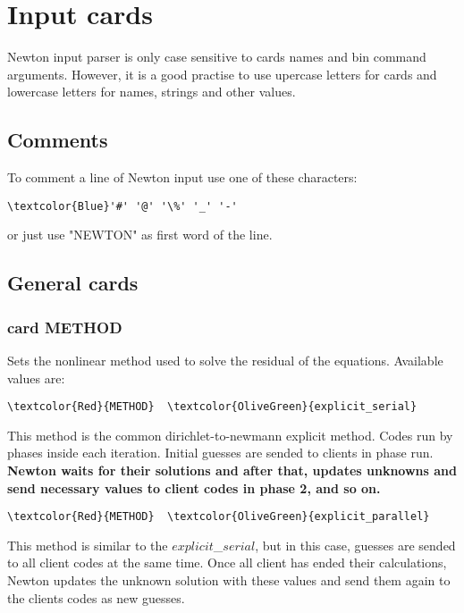 \chapter{Input cards}




Newton input parser is only case sensitive to cards names and bin command arguments. However, it is a good practise to use upercase letters for cards and lowercase letters for names, strings and other values.

\section{Comments}
To comment a line of Newton input use one of these characters:
\begin{Verbatim}[frame=single,commandchars=\\\{\}]
\textcolor{Blue}'#' '@' '\%' '_' '-'
\end{Verbatim}
or just use "NEWTON" as first word of the line.

\section{General cards}

\subsection{card METHOD}

Sets the nonlinear method used to solve the residual of the equations. Available values are: 

\begin{Verbatim}[frame=single,commandchars=\\\{\}]
\textcolor{Red}{METHOD}  \textcolor{OliveGreen}{explicit_serial} 
\end{Verbatim}
This method is the common dirichlet-to-newmann explicit method. Codes run by phases inside each iteration. Initial guesses are sended to clients in phase run. \bf{Newton} waits for their solutions and after that, updates unknowns and send necessary values to client codes in phase 2, and so on.

\begin{Verbatim}[frame=single,commandchars=\\\{\}]
\textcolor{Red}{METHOD}  \textcolor{OliveGreen}{explicit_parallel} 
\end{Verbatim}
This method is similar to the $explicit$_$serial$, but in this case, guesses are sended to all client codes at the same time. Once all client has ended their calculations, Newton updates the unknown solution with these values and send them again to the clients codes as new guesses.

